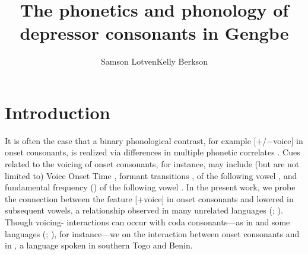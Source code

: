 \documentclass[output=paper,newtxmath,modfonts,nonflat,hidelinks]{langsci/langscibook}
\author{Samson Lotven\affiliation{Indiana University Bloomington}\lastand Kelly Berkson\affiliation{Indiana University Bloomington} }
\title{The phonetics and phonology of depressor consonants in Gengbe}
\begin{document}
\maketitle
 \newcommand{\nocaption}[1]{{\color{red} Please provide a caption}}
 

 

 

 

 

 

\section{Introduction}\label{sec:lotven:1}
It is often the case that a binary phonological contrast, for example [+/−voice] in onset consonants, is realized via differences in multiple phonetic correlates \citep{wright2004}. Cues related to the voicing of onset consonants, for instance, may include (but are not limited to) Voice Onset Time \citep{Lisker1964}, formant transitions \citep{Stevens1973},  of the following vowel \citep{Chistovich1969}, and fundamental frequency ()  of the following vowel \citep{Shimizu1989}. In the present work, we probe the connection between the feature [+voice] in onset consonants and lowered  in subsequent vowels, a relationship observed in many unrelated languages (\citealt{Bradshaw1999}; \citealt{Tang2008}). Though voicing- interactions can occur with coda consonants—as in  and some  languages (\citealt{Maran1973}; \citealt{Matisoff1973}), for instance—we  on the interaction between onset consonants and  in , a  language spoken in southern Togo and Benin.
\end{document}
